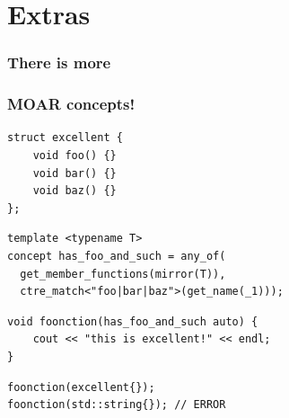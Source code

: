 \documentclass[compress,table,xcolor=table]{beamer}
\begin{document}
\section{Extras}
\begin{frame}
  \frametitle{There is more}
\end{frame}
\begin{frame}[fragile]
  \frametitle{MOAR  concepts!}
  \begin{lstlisting}[language=c++2x,basicstyle=\small\ttfamily]
struct excellent {
    void foo() {}
    void bar() {}
    void baz() {}
};
  \end{lstlisting}
  \vfill
  \begin{lstlisting}[language=c++2x,basicstyle=\small\ttfamily]
template <typename T>
concept has_foo_and_such = any_of(
  get_member_functions(mirror(T)),
  ctre_match<"foo|bar|baz">(get_name(_1)));
  \end{lstlisting}
  \vfill
  \begin{lstlisting}[language=c++2x,basicstyle=\small\ttfamily]
void foonction(has_foo_and_such auto) {
    cout << "this is excellent!" << endl;
}
  \end{lstlisting}
  \vfill
  \begin{lstlisting}[language=c++2x,basicstyle=\small\ttfamily]
foonction(excellent{});
foonction(std::string{}); // ERROR
  \end{lstlisting}
\end{frame}
\end{document}
